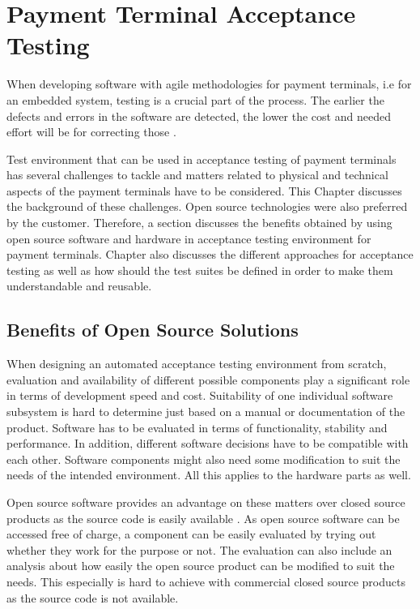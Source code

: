 
\chapter{Payment Terminal Acceptance Testing}
\label{chapter:Payment terminal acceptance testing} 

When developing software with agile methodologies for payment terminals, i.e for an embedded system, testing is a crucial part of the process. The earlier the defects and errors in the software are detected, the lower the cost and needed effort will be for correcting those \citep{myers2011art}.

Test environment that can be used in acceptance testing of payment terminals has several challenges to tackle and matters related to physical and technical aspects of the payment terminals have to be considered. This Chapter discusses the background of these challenges. Open source technologies were also preferred by the customer. Therefore, a section discusses the benefits obtained by using open source software and hardware in acceptance testing environment for payment terminals. Chapter also discusses the different approaches for acceptance testing as well as how should the test suites be defined in order to make them understandable and reusable.

\section{Benefits of Open Source Solutions}
\label{section:Open source}

When designing an automated acceptance testing environment from scratch, evaluation and availability of different possible components play a significant role in terms of development speed and cost. Suitability of one individual software subsystem is hard to determine just based on a manual or documentation of the product. Software has to be evaluated in terms of functionality, stability and performance. In addition, different software decisions have to be compatible with each other. Software components might also need some modification to suit the needs of the intended environment. All this applies to the hardware parts as well.

Open source software provides an advantage on these matters over closed source products as the source code is easily available \citep{morgan2007benefits}. As open source software can be accessed free of charge, a component can be easily evaluated by trying out whether they work for the purpose or not. The evaluation can also include an analysis about how easily the open source product can be modified to suit the needs. This especially is hard to achieve with commercial closed source products as the source code is not available.

